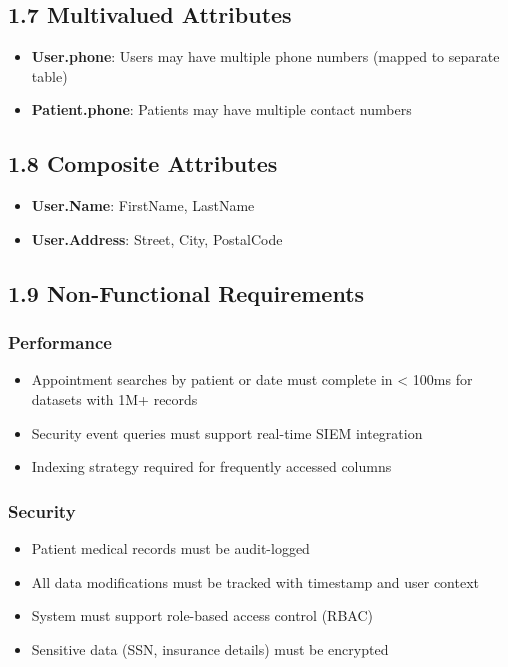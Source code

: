 \subsection*{1.7 Multivalued Attributes}

\begin{itemize}
    \item \textbf{User.phone}: Users may have multiple phone numbers (mapped to separate table)
    \item \textbf{Patient.phone}: Patients may have multiple contact numbers
\end{itemize}

\subsection*{1.8 Composite Attributes}

\begin{itemize}
    \item \textbf{User.Name}: FirstName, LastName
    \item \textbf{User.Address}: Street, City, PostalCode
\end{itemize}

\subsection*{1.9 Non-Functional Requirements}

\subsubsection*{Performance}
\begin{itemize}
    \item Appointment searches by patient or date must complete in < 100ms for datasets with 1M+ records
    \item Security event queries must support real-time SIEM integration
    \item Indexing strategy required for frequently accessed columns
\end{itemize}

\subsubsection*{Security}
\begin{itemize}
    \item Patient medical records must be audit-logged
    \item All data modifications must be tracked with timestamp and user context
    \item System must support role-based access control (RBAC)
    \item Sensitive data (SSN, insurance details) must be encrypted
\end{itemize}


